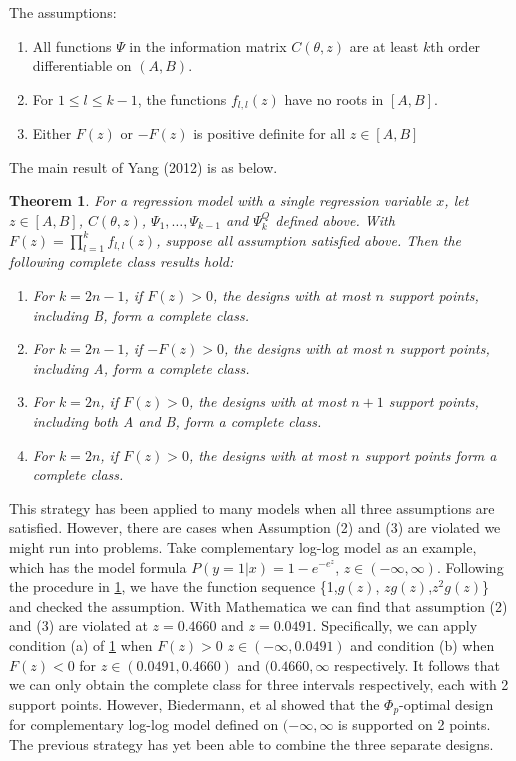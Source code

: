 \documentclass[11pt]{amsart}
\newtheorem{theorem}{Theorem}[section]
\theoremstyle{definition}
\theoremstyle{remark}
\begin{document}
The assumptions:
\begin{enumerate}
\item All functions $\Psi$ in the information matrix $C(\theta,z)$ are at least $k$th order differentiable on $(A,B)$.
\item For $1\le l\le k-1$, the functions $f_{l,l}(z)$ have no roots in $[A,B]$.
\item Either $F(z)$ or $-F(z)$ is positive definite for all $z\in [A,B]$
\end{enumerate} 

The main result of Yang (2012) is as below.

\begin{theorem}\label{2012}
For a regression model with a single regression variable $x$, let $z\in[A,B]$, $C(\theta,z)$, $\Psi_1,\ldots, \Psi_{k-1}$ and $\Psi_k^Q$ defined above. With  $F(z) = \prod_{l=1}^k f_{l,l}(z)$, suppose all assumption satisfied above. Then the following complete class results hold:\begin{enumerate}
\item[(a)] For $k = 2n-1$, if $F(z)>0$, the designs with at most $n$ support points, including B, form a complete class.
\item[(b)] For $k = 2n-1$, if $-F(z)>0$, the designs with at most $n$ support points, including A, form a complete class.
\item[(c)] For $k = 2n$, if $F(z)>0$, the designs with at most $n+1$ support points, including both A and B, form a complete class.
\item[(d)] For $k = 2n$, if $F(z)>0$, the designs with at most $n$ support points form a complete class.
\end{enumerate}
\end{theorem}

 This strategy has been applied to many models when all three assumptions are satisfied. However, there are cases when Assumption (2) and (3) are violated we might run into problems. Take complementary log-log model as an example, which has the model formula $P(y=1|x) = 1-e^{-e^{z}}$, $z\in(-\infty,\infty)$. Following the procedure in \ref{2012}, we have the function sequence \{1,$g(z)$, $zg(z)$,$z^2g(z)$\} and checked the assumption. With Mathematica we can find that assumption (2) and (3) are violated at $z=0.4660$ and $z=0.0491$. Specifically, we can apply condition (a) of \ref{2012} when $F(z) >0$ $z\in (-\infty, 0.0491)$ and condition (b) when $F(z)<0$ for $z\in(0.0491, 0.4660)$ and $(0.4660,\infty$ respectively. It follows that we can only obtain the complete class for three intervals respectively, each with 2 support points. However, Biedermann, et al \cite{biedermann2006} showed that the $\Phi_p$-optimal design for complementary log-log model defined on $(-\infty,\infty$ is supported on 2 points. The previous strategy has yet been able to combine the three separate designs. 
 
\end{document}
